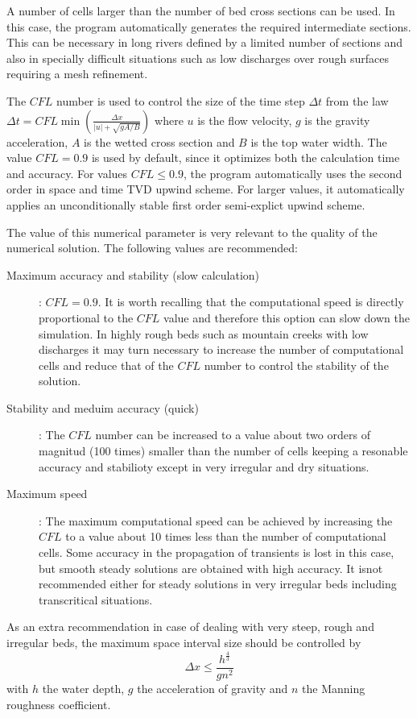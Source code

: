 \documentclass[a4paper,12pt]{article}
\begin{document}
A number of cells larger than the number of bed cross sections can be used. In
this case, the program automatically generates the required intermediate
sections. This can be necessary in long rivers defined by a limited number of
sections and also in specially difficult situations such as low discharges over
rough surfaces requiring a mesh refinement.

The $CFL$ number is used to control the size of the time step $\Delta t$ from
the law $\Delta t=CFL\min\left(\frac{\Delta x}{|u|+\sqrt{gA/B}}\right)$ where
$u$ is the flow velocity, $g$ is the gravity acceleration, $A$ is the wetted
cross section and $B$ is the top water width. The value $CFL=0.9$ is used by
default, since it optimizes both the calculation time and accuracy. For values
$CFL\leq 0.9$, the program automatically uses the second order in space and time
TVD upwind scheme. For larger values, it automatically applies an
unconditionally stable first order semi-explict upwind scheme.

The value of this numerical parameter is very relevant to the quality of the
numerical solution. The following values are recommended:
\begin{description}
\item[Maximum accuracy and stability (slow calculation)]: $CFL=0.9$.
It is worth recalling that the computational speed is directly proportional to
the $CFL$ value and therefore this option can slow down the simulation. In
highly rough beds such as mountain creeks with low discharges it may turn
necessary to increase the number of computational cells and reduce that of the
$CFL$ number to control the stability of the solution.
\item[Stability and meduim accuracy (quick)]: The $CFL$ number can be increased
to a value about two orders of magnitud (100 times) smaller than the number of
cells keeping a resonable accuracy and stabilioty except in very irregular and
dry situations.
\item[Maximum speed]: The maximum computational speed can be achieved by
increasing the $CFL$ to a value about 10 times less than the number of
computational cells. Some accuracy in the propagation of transients is lost in
this case, but smooth steady solutions are obtained with high accuracy. It isnot
recommended either for steady solutions in very irregular beds including
transcritical situations.
\end{description}

As an extra recommendation in case of dealing with very steep, rough and
irregular beds, the maximum space interval size should be controlled by
\[\Delta x\leq\frac{h^\frac{4}{3}}{gn^2}\]
with $h$ the water depth, $g$ the acceleration of gravity and $n$ the Manning
roughness coefficient.
\end{document}
